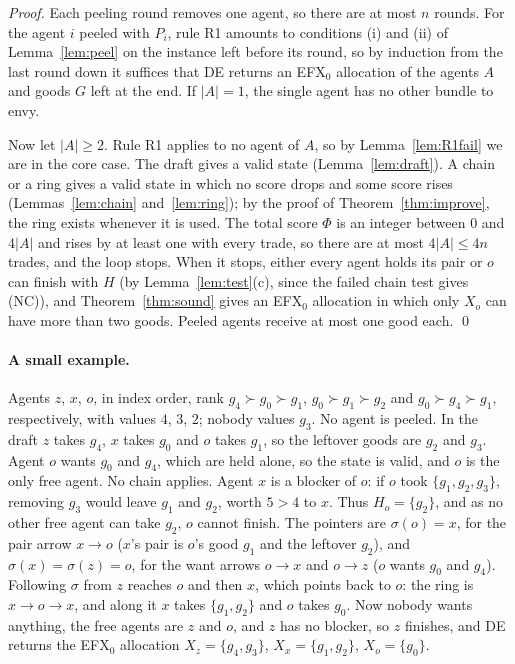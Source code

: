 \documentclass[runningheads,11pt]{llncs}
\newcommand{\efxz}{\texorpdfstring{\mbox{EFX$_0$}}{EFX0}}
\newcommand{\DE}{\textup{DE}}
\begin{document}
\begin{proof}
Each peeling round removes one agent, so there are at most $n$ rounds. For the agent $i$ peeled with $P_i$, rule R1 amounts to conditions (i) and (ii) of Lemma~\ref{lem:peel} on the instance left before its round, so by induction from the last round down it suffices that \DE{} returns an \efxz{} allocation of the agents $A$ and goods $G$ left at the end. If $|A|=1$, the single agent has no other bundle to envy.

Now let $|A|\ge2$. Rule R1 applies to no agent of $A$, so by Lemma~\ref{lem:R1fail} we are in the core case. The draft gives a valid state (Lemma~\ref{lem:draft}). A chain or a ring gives a valid state in which no score drops and some score rises (Lemmas~\ref{lem:chain} and~\ref{lem:ring}); by the proof of Theorem~\ref{thm:improve}, the ring exists whenever it is used. The total score $\Phi$ is an integer between $0$ and $4|A|$ and rises by at least one with every trade, so there are at most $4|A|\le4n$ trades, and the loop stops. When it stops, either every agent holds its pair or $o$ can finish with $H$ (by Lemma~\ref{lem:test}(c), since the failed chain test gives (NC)), and Theorem~\ref{thm:sound} gives an \efxz{} allocation in which only $X_o$ can have more than two goods. Peeled agents receive at most one good each. \qed
\end{proof}

\paragraph{A small example.} Agents $z$, $x$, $o$, in index order, rank $g_4\succ g_0\succ g_1$, $g_0\succ g_1\succ g_2$ and $g_0\succ g_4\succ g_1$, respectively, with values $4$, $3$, $2$; nobody values $g_3$. No agent is peeled. In the draft $z$ takes $g_4$, $x$ takes $g_0$ and $o$ takes $g_1$, so the leftover goods are $g_2$ and $g_3$. Agent $o$ wants $g_0$ and $g_4$, which are held alone, so the state is valid, and $o$ is the only free agent. No chain applies. Agent $x$ is a blocker of $o$: if $o$ took $\{g_1,g_2,g_3\}$, removing $g_3$ would leave $g_1$ and $g_2$, worth $5>4$ to $x$. Thus $H_o=\{g_2\}$, and as no other free agent can take $g_2$, $o$ cannot finish. The pointers are $\sigma(o)=x$, for the pair arrow $x\to o$ ($x$'s pair is $o$'s good $g_1$ and the leftover $g_2$), and $\sigma(x)=\sigma(z)=o$, for the want arrows $o\to x$ and $o\to z$ ($o$ wants $g_0$ and $g_4$). Following $\sigma$ from $z$ reaches $o$ and then $x$, which points back to $o$: the ring is $x\to o\to x$, and along it $x$ takes $\{g_1,g_2\}$ and $o$ takes $g_0$. Now nobody wants anything, the free agents are $z$ and $o$, and $z$ has no blocker, so $z$ finishes, and \DE{} returns the \efxz{} allocation $X_z=\{g_4,g_3\}$, $X_x=\{g_1,g_2\}$, $X_o=\{g_0\}$.
\end{document}
